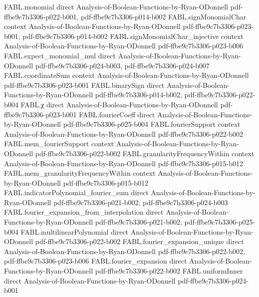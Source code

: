 \begin{theorem}
\proofstep
  {FABL.monomial}
  {direct}
  {Analysis-of-Boolean-Functions-by-Ryan-ODonnell}
  {pdf-ffbe9c7b3306-p022-b001,
    pdf-ffbe9c7b3306-p014-b002}
\proofstep
  {FABL.signMonomialChar}
  {context}
  {Analysis-of-Boolean-Functions-by-Ryan-ODonnell}
  {pdf-ffbe9c7b3306-p023-b001,
    pdf-ffbe9c7b3306-p014-b002}
\proofstep
  {FABL.signMonomialChar_injective}
  {context}
  {Analysis-of-Boolean-Functions-by-Ryan-ODonnell}
  {pdf-ffbe9c7b3306-p023-b006}
\proofstep
  {FABL.expect_monomial_mul}
  {direct}
  {Analysis-of-Boolean-Functions-by-Ryan-ODonnell}
  {pdf-ffbe9c7b3306-p024-b003,
    pdf-ffbe9c7b3306-p024-b007}
\proofstep
  {FABL.coordinateSum}
  {context}
  {Analysis-of-Boolean-Functions-by-Ryan-ODonnell}
  {pdf-ffbe9c7b3306-p023-b001}
\proofstep
  {FABL.binarySign}
  {direct}
  {Analysis-of-Boolean-Functions-by-Ryan-ODonnell}
  {pdf-ffbe9c7b3306-p014-b002,
    pdf-ffbe9c7b3306-p022-b004}
\proofstep
  {FABL.χ}
  {direct}
  {Analysis-of-Boolean-Functions-by-Ryan-ODonnell}
  {pdf-ffbe9c7b3306-p023-b001}
\proofstep
  {FABL.fourierCoeff}
  {direct}
  {Analysis-of-Boolean-Functions-by-Ryan-ODonnell}
  {pdf-ffbe9c7b3306-p025-b004}
\proofstep
  {FABL.fourierSupport}
  {context}
  {Analysis-of-Boolean-Functions-by-Ryan-ODonnell}
  {pdf-ffbe9c7b3306-p022-b002}
\proofstep
  {FABL.mem_fourierSupport}
  {context}
  {Analysis-of-Boolean-Functions-by-Ryan-ODonnell}
  {pdf-ffbe9c7b3306-p022-b002}
\proofstep
  {FABL.granularityFrequencyWithin}
  {context}
  {Analysis-of-Boolean-Functions-by-Ryan-ODonnell}
  {pdf-ffbe9c7b3306-p015-b012}
\proofstep
  {FABL.mem_granularityFrequencyWithin}
  {context}
  {Analysis-of-Boolean-Functions-by-Ryan-ODonnell}
  {pdf-ffbe9c7b3306-p015-b012}
\proofstep
  {FABL.indicatorPolynomial_fourier_sum}
  {direct}
  {Analysis-of-Boolean-Functions-by-Ryan-ODonnell}
  {pdf-ffbe9c7b3306-p021-b002,
    pdf-ffbe9c7b3306-p024-b003}
\proofstep
  {FABL.fourier_expansion_from_interpolation}
  {direct}
  {Analysis-of-Boolean-Functions-by-Ryan-ODonnell}
  {pdf-ffbe9c7b3306-p021-b002,
    pdf-ffbe9c7b3306-p025-b004}
\proofstep
  {FABL.multilinearPolynomial}
  {direct}
  {Analysis-of-Boolean-Functions-by-Ryan-ODonnell}
  {pdf-ffbe9c7b3306-p022-b002}
\proofstep
  {FABL.fourier_expansion_unique}
  {direct}
  {Analysis-of-Boolean-Functions-by-Ryan-ODonnell}
  {pdf-ffbe9c7b3306-p022-b002,
    pdf-ffbe9c7b3306-p023-b006}
\proofstep
  {FABL.fourier_expansion}
  {direct}
  {Analysis-of-Boolean-Functions-by-Ryan-ODonnell}
  {pdf-ffbe9c7b3306-p022-b002}
\proofstep
  {FABL.uniformInner}
  {direct}
  {Analysis-of-Boolean-Functions-by-Ryan-ODonnell}
  {pdf-ffbe9c7b3306-p024-b001}

\end{theorem}
